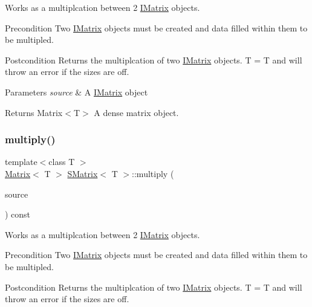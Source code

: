 Works as a multiplcation between 2 \mbox{\hyperlink{class_i_matrix}{I\+Matrix}} objects. 

\begin{DoxyPrecond}{Precondition}
Two \mbox{\hyperlink{class_i_matrix}{I\+Matrix}} objects must be created and data filled within them to be multipled. 
\end{DoxyPrecond}
\begin{DoxyPostcond}{Postcondition}
Returns the multiplcation of two \mbox{\hyperlink{class_i_matrix}{I\+Matrix}} objects. T = T and will throw an error if the sizes are off.
\end{DoxyPostcond}

\begin{DoxyParams}{Parameters}
{\em source} & A \mbox{\hyperlink{class_i_matrix}{I\+Matrix}} object \\
\hline
\end{DoxyParams}
\begin{DoxyReturn}{Returns}
Matrix$<$\+T$>$ A dense matrix object. 
\end{DoxyReturn}
\mbox{\label{class_s_matrix_a7152c62ca6b3a7b32737d66b064b198b}} 
\subsubsection{\texorpdfstring{multiply()}{multiply()}\hspace{0.1cm}{\footnotesize\ttfamily [2/6]}}
{\footnotesize\ttfamily template$<$class T $>$ \\
\mbox{\hyperlink{class_matrix}{Matrix}}$<$ T $>$ \mbox{\hyperlink{class_s_matrix}{S\+Matrix}}$<$ T $>$\+::multiply (\begin{DoxyParamCaption}\item[{const \mbox{\hyperlink{class_i_matrix}{I\+Matrix}}$<$ \mbox{\hyperlink{class_t_matrix}{T\+Matrix}}$<$ T $>$, T $>$ \&}]{source }\end{DoxyParamCaption}) const}



Works as a multiplcation between 2 \mbox{\hyperlink{class_i_matrix}{I\+Matrix}} objects. 

\begin{DoxyPrecond}{Precondition}
Two \mbox{\hyperlink{class_i_matrix}{I\+Matrix}} objects must be created and data filled within them to be multipled. 
\end{DoxyPrecond}
\begin{DoxyPostcond}{Postcondition}
Returns the multiplcation of two \mbox{\hyperlink{class_i_matrix}{I\+Matrix}} objects. T = T and will throw an error if the sizes are off.
\end{DoxyPostcond}

